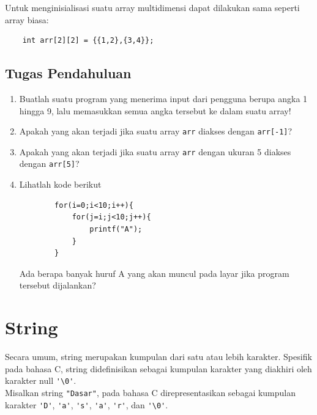 Untuk menginisialisasi suatu array multidimensi dapat dilakukan sama seperti array biasa:
\begin{verbatim}
    int arr[2][2] = {{1,2},{3,4}};
\end{verbatim}

\subsection{Tugas Pendahuluan}
\begin{enumerate}
	\item Buatlah suatu program yang menerima input dari pengguna berupa angka 1 hingga 9, lalu memasukkan semua angka tersebut ke dalam suatu array!
	\item Apakah yang akan terjadi jika suatu array \verb|arr| diakses dengan \verb|arr[-1]|?
	\item Apakah yang akan terjadi jika suatu array \verb|arr| dengan ukuran 5 diakses dengan \verb|arr[5]|?
	\item Lihatlah kode berikut
	      \begin{verbatim}
        for(i=0;i<10;i++){
            for(j=i;j<10;j++){
                printf("A");
            }
        }
    \end{verbatim}
	      Ada berapa banyak huruf A yang akan muncul pada layar jika program tersebut dijalankan?
\end{enumerate}

\section{String}
Secara umum, string merupakan kumpulan dari satu atau lebih karakter. Spesifik pada bahasa C, string didefinisikan sebagai kumpulan karakter yang diakhiri oleh karakter null \verb|'\0'|.
\\
Misalkan string  \verb|"Dasar"|, pada bahasa C direpresentasikan sebagai kumpulan karakter \verb|'D'|, \verb|'a'|, \verb|'s'|, \verb|'a'|, \verb|'r'|, dan \verb|'\0'|.

